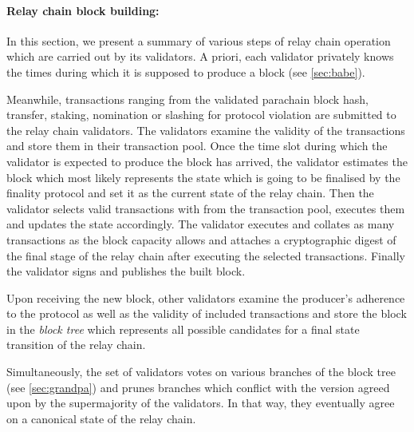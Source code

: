 \paragraph{Relay chain block building:}\label{sec:relaychainblockproduction}
In this section, we present a summary of various steps of relay chain operation which are carried out by its validators. A priori, each validator privately knows the times during which it is supposed to produce a block (see \ref{sec:babe}).

Meanwhile, transactions ranging from the validated parachain block hash, transfer, staking, nomination or slashing for protocol violation are submitted to the relay chain validators. The validators examine the validity of the transactions and store them in their transaction pool. Once the time slot during which the validator is expected to produce the block has arrived, the validator estimates the block which most likely represents the state which is going to be finalised by the finality protocol and set it as the current state of the relay chain. Then the validator selects valid transactions with from the transaction pool, executes them and updates the state accordingly. The validator executes and collates as many transactions as the block capacity allows and attaches a cryptographic digest of the final stage of the relay chain after executing the selected transactions. Finally the validator signs and publishes the built block.

Upon receiving the new block, other validators examine the producer's adherence to the protocol as well as the validity of included transactions and store the block in the \emph{block tree} which represents all possible candidates for a final state transition of the relay chain. 

Simultaneously, the set of validators votes on various branches of the block tree (see \ref{sec:grandpa}) and prunes branches which conflict with the version agreed upon by the supermajority of the validators. In that way, they eventually agree on a canonical state of the relay chain.




